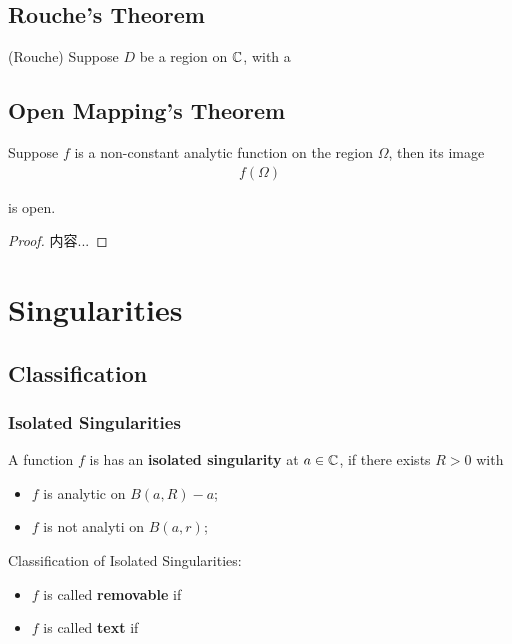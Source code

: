 \documentclass[Total.tex]{subfiles}
\begin{document}
			\subsection{Rouche's Theorem}
				\begin{theorem}
					(Rouche) Suppose $D$ be a region on $\mathbb{C}$, with a 
				\end{theorem}
			\subsection{Open Mapping's Theorem}
				\begin{theorem}
					Suppose $f$ is a non-constant analytic function on the region $\Omega$, then its image
					\begin{gather*}
						f(\Omega)
					\end{gather*}
					
					is open.
				\end{theorem}
				\begin{proof}
					内容...
				\end{proof}
		\section{Singularities}
			\subsection{Classification}
				\subsubsection{Isolated Singularities}
				\begin{Def}
					A function $f$ is has an \textbf{isolated singularity} at $a\in \mathbb{C}$, if there exists $R>0$ with
					\begin{itemize}
						\item $f$ is analytic on $B(a,R)-a$;
						\item $f$ is not analyti on $B(a,r)$;
					\end{itemize}
					
					Classification of Isolated Singularities:
					\begin{itemize}
						\item $f$ is called \textbf{removable} if 
						\item $f$ is called \textbf{text} if 
					\end{itemize}
				\end{Def}
				
\end{document}
